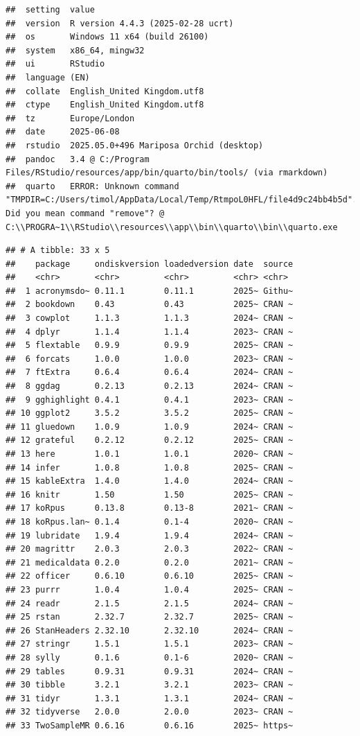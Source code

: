 \documentclass[
]{article}
\begin{document}
\begin{verbatim}
##  setting  value
##  version  R version 4.4.3 (2025-02-28 ucrt)
##  os       Windows 11 x64 (build 26100)
##  system   x86_64, mingw32
##  ui       RStudio
##  language (EN)
##  collate  English_United Kingdom.utf8
##  ctype    English_United Kingdom.utf8
##  tz       Europe/London
##  date     2025-06-08
##  rstudio  2025.05.0+496 Mariposa Orchid (desktop)
##  pandoc   3.4 @ C:/Program Files/RStudio/resources/app/bin/quarto/bin/tools/ (via rmarkdown)
##  quarto   ERROR: Unknown command "TMPDIR=C:/Users/timol/AppData/Local/Temp/RtmpoL0HFL/file4d9c24bb4b5d". Did you mean command "remove"? @ C:\\PROGRA~1\\RStudio\\resources\\app\\bin\\quarto\\bin\\quarto.exe
\end{verbatim}

\begin{verbatim}
## # A tibble: 33 x 5
##    package     ondiskversion loadedversion date  source
##    <chr>       <chr>         <chr>         <chr> <chr> 
##  1 acronymsdo~ 0.11.1        0.11.1        2025~ Githu~
##  2 bookdown    0.43          0.43          2025~ CRAN ~
##  3 cowplot     1.1.3         1.1.3         2024~ CRAN ~
##  4 dplyr       1.1.4         1.1.4         2023~ CRAN ~
##  5 flextable   0.9.9         0.9.9         2025~ CRAN ~
##  6 forcats     1.0.0         1.0.0         2023~ CRAN ~
##  7 ftExtra     0.6.4         0.6.4         2024~ CRAN ~
##  8 ggdag       0.2.13        0.2.13        2024~ CRAN ~
##  9 gghighlight 0.4.1         0.4.1         2023~ CRAN ~
## 10 ggplot2     3.5.2         3.5.2         2025~ CRAN ~
## 11 gluedown    1.0.9         1.0.9         2024~ CRAN ~
## 12 grateful    0.2.12        0.2.12        2025~ CRAN ~
## 13 here        1.0.1         1.0.1         2020~ CRAN ~
## 14 infer       1.0.8         1.0.8         2025~ CRAN ~
## 15 kableExtra  1.4.0         1.4.0         2024~ CRAN ~
## 16 knitr       1.50          1.50          2025~ CRAN ~
## 17 koRpus      0.13.8        0.13-8        2021~ CRAN ~
## 18 koRpus.lan~ 0.1.4         0.1-4         2020~ CRAN ~
## 19 lubridate   1.9.4         1.9.4         2024~ CRAN ~
## 20 magrittr    2.0.3         2.0.3         2022~ CRAN ~
## 21 medicaldata 0.2.0         0.2.0         2021~ CRAN ~
## 22 officer     0.6.10        0.6.10        2025~ CRAN ~
## 23 purrr       1.0.4         1.0.4         2025~ CRAN ~
## 24 readr       2.1.5         2.1.5         2024~ CRAN ~
## 25 rstan       2.32.7        2.32.7        2025~ CRAN ~
## 26 StanHeaders 2.32.10       2.32.10       2024~ CRAN ~
## 27 stringr     1.5.1         1.5.1         2023~ CRAN ~
## 28 sylly       0.1.6         0.1-6         2020~ CRAN ~
## 29 tables      0.9.31        0.9.31        2024~ CRAN ~
## 30 tibble      3.2.1         3.2.1         2023~ CRAN ~
## 31 tidyr       1.3.1         1.3.1         2024~ CRAN ~
## 32 tidyverse   2.0.0         2.0.0         2023~ CRAN ~
## 33 TwoSampleMR 0.6.16        0.6.16        2025~ https~
\end{verbatim}

\newpage
\end{document}
